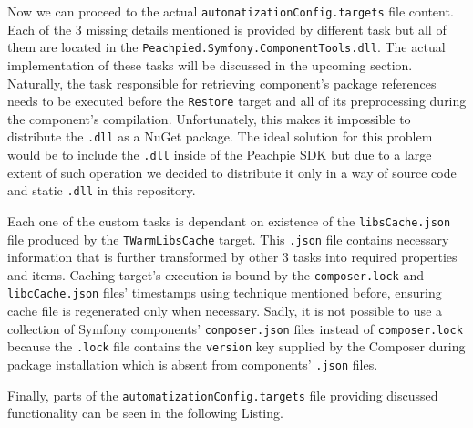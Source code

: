 Now we can proceed to the actual \texttt{automatizationConfig.targets} file content. Each of the 3 missing details mentioned is provided by different task but all of them are located in the \texttt{Peachpied.Symfony.ComponentTools.dll}. The actual implementation of these tasks will be discussed in the upcoming section. Naturally, the task responsible for retrieving component's package references needs to be executed before the \texttt{Restore} target and all of its preprocessing during the component's compilation. Unfortunately, this makes it impossible to distribute the \texttt{.dll} as a NuGet package. The ideal solution for this problem would be to include the \texttt{.dll} inside of the Peachpie SDK but due to a large extent of such operation we decided to distribute it only in a way of source code and static \texttt{.dll} in this repository.

Each one of the custom tasks is dependant on existence of the \texttt{libsCache.json} file produced by the \texttt{TWarmLibsCache} target. This \texttt{.json} file contains necessary information that is further transformed by other 3 tasks into required properties and items. Caching target's execution is bound by the \texttt{composer.lock} and \texttt{libcCache.json} files' timestamps using technique mentioned before, ensuring cache file is regenerated only when necessary. Sadly, it is not possible to use a collection of Symfony components' \texttt{composer.json} files instead of \texttt{composer.lock} because the \texttt{.lock} file contains the \texttt{version} key supplied by the Composer during package installation which is absent from components' \texttt{.json} files.

Finally, parts of the \texttt{automatizationConfig.targets} file providing discussed functionality can be seen in the following Listing.

